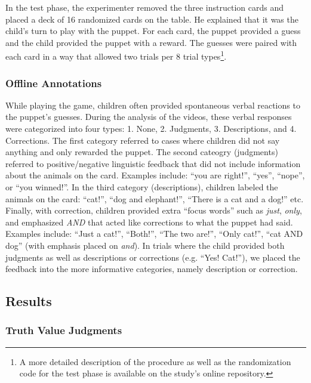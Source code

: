 \documentclass[,man,floatsintext]{apa6}
\let\rmarkdownfootnote\footnote%
\def\footnote{\protect\rmarkdownfootnote}
\begin{document}
In the test phase, the experimenter removed the three instruction cards and placed a deck of 16 randomized cards on the table. He explained that it was the child's turn to play with the puppet. For each card, the puppet provided a guess and the child provided the puppet with a reward. The guesses were paired with each card in a way that allowed two trials per 8 trial types\footnote{A more detailed description of the procedure as well as the randomization code for the test phase is available on the study's online repository.}.

\hypertarget{feedbackCoding}{%
\subsubsection{Offline Annotations}\label{feedbackCoding}}

While playing the game, children often provided spontaneous verbal reactions to the puppet's guesses. During the analysis of the videos, these verbal responses were categorized into four types: 1. None, 2. Judgments, 3. Descriptions, and 4. Corrections. The first category referred to cases where children did not say anything and only rewarded the puppet. The second cateogry (judgments) referred to positive/negative linguistic feedback that did not include information about the animals on the card. Examples include: \enquote{you are right!}, \enquote{yes}, \enquote{nope}, or \enquote{you winned!}. In the third category (descriptions), children labeled the animals on the card: \enquote{cat!}, \enquote{dog and elephant!}, \enquote{There is a cat and a dog!} etc. Finally, with correction, children provided extra \enquote{focus words} such as \emph{just}, \emph{only}, and emphasized \emph{AND} that acted like corrections to what the puppet had said. Examples include: \enquote{Just a cat!}, \enquote{Both!}, \enquote{The two are!}, \enquote{Only cat!}, \enquote{cat AND dog} (with emphasis placed on \emph{and}). In trials where the child provided both judgments as well as descriptions or corrections (e.g. \enquote{Yes! Cat!}), we placed the feedback into the more informative categories, namely description or correction.

\hypertarget{results-1}{%
\subsection{Results}\label{results-1}}

\hypertarget{truth-value-judgments}{%
\subsubsection{Truth Value Judgments}\label{truth-value-judgments}}
\end{document}
